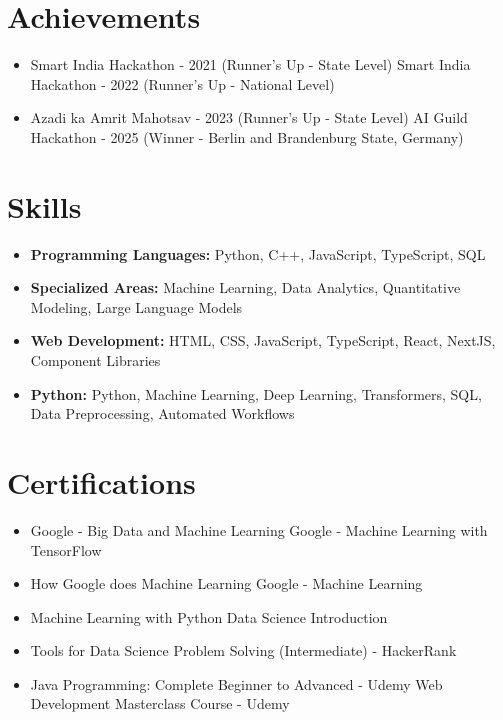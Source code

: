 \documentclass[a4paper,10pt]{article}
\begin{document}
\section*{Achievements}
\begin{itemize}
\item Smart India Hackathon - 2021 (Runner's Up - State Level) \hfill Smart India Hackathon - 2022 (Runner's Up - National Level)
\item Azadi ka Amrit Mahotsav - 2023 (Runner's Up - State Level) \hfill AI Guild Hackathon - 2025 (Winner - Berlin and Brandenburg State, Germany)
\end{itemize}

\section*{Skills}
\begin{itemize}
  \item \textbf{Programming Languages:} Python, C++, JavaScript, TypeScript, SQL
  \item \textbf{Specialized Areas:} Machine Learning, Data Analytics, Quantitative Modeling, Large Language Models
  \item \textbf{Web Development:} HTML, CSS, JavaScript, TypeScript, React, NextJS, Component Libraries
  \item \textbf{Python:} Python, Machine Learning, Deep Learning, Transformers, SQL, Data Preprocessing, Automated Workflows
\end{itemize}

\section*{Certifications}
\begin{itemize}
\item Google - Big Data and Machine Learning \hfill Google - Machine Learning with TensorFlow
\item How Google does Machine Learning \hfill Google - Machine Learning
\item Machine Learning with Python \hfill Data Science Introduction
\item Tools for Data Science \hfill Problem Solving (Intermediate) - HackerRank
\item Java Programming: Complete Beginner to Advanced - Udemy \hfill Web Development Masterclass Course - Udemy
\end{itemize}
\end{document}
